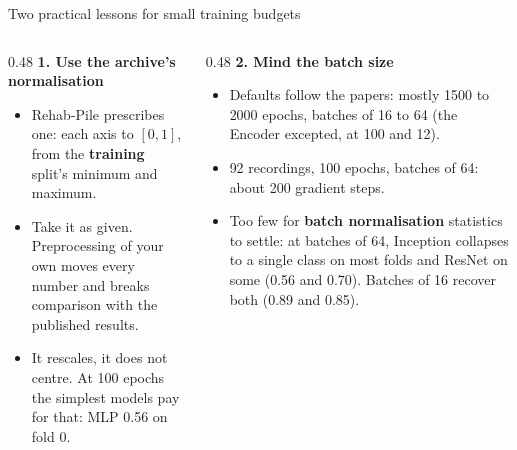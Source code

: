 \documentclass[aspectratio=169,10pt]{beamer}
\begin{document}
\begin{frame}{Two practical lessons for small training budgets}
  \begin{columns}[t]
    \begin{column}{0.48\textwidth}
      \textbf{1. Use the archive's normalisation}
      \begin{itemize}
        \item Rehab-Pile prescribes one: each axis to $[0, 1]$, from the \textbf{training} split's minimum and maximum.
        \item Take it as given. Preprocessing of your own moves every number and breaks comparison with the published results.
        \item It rescales, it does not centre. At 100 epochs the simplest models pay for that: MLP 0.56 on fold 0.
      \end{itemize}
    \end{column}
    \begin{column}{0.48\textwidth}
      \textbf{2. Mind the batch size}
      \begin{itemize}
        \item Defaults follow the papers: mostly 1500 to 2000 epochs, batches of 16 to 64 (the Encoder excepted, at 100 and 12).
        \item 92 recordings, 100 epochs, batches of 64: about 200 gradient steps.
        \item Too few for \textbf{batch normalisation} statistics to settle: at batches of 64, Inception collapses to a single class on most folds and ResNet on some (0.56 and 0.70). Batches of 16 recover both (0.89 and 0.85).
      \end{itemize}
    \end{column}
  \end{columns}
  \vfill
\end{frame}
\end{document}
